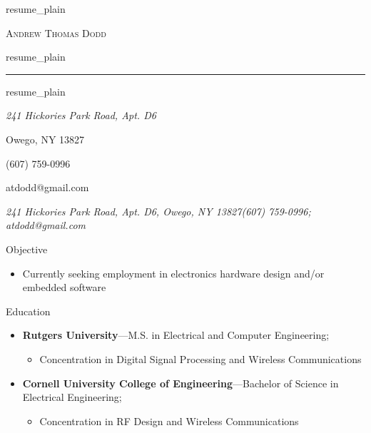 \documentclass[10pt,oneside]{article}
\makeatletter
\newcommand{\name}{Andrew Thomas Dodd}
\newcommand{\addra}{241 Hickories Park Road, Apt. D6}
\newcommand{\addrb}{Owego, NY 13827}
\newcommand{\addr}{\addra, \addrb}
\newcommand{\phone}{(607) 759-0996}
\newcommand{\email}{atdodd@gmail.com}
\def\txtname{resume_plain}\edef\txtname{\expandafter\strip@prefix\meaning\txtname}
\edef\fname{\jobname}
\newcommand{\bigname}[1]{
	\begin{center}\Huge\scshape#1\end{center}
}
\newenvironment{ressection}[1]{
	\vspace{4pt}
	{\Large#1}
	\begin{itemize}
	\vspace{3pt}
}{
	\end{itemize}
}
\newcommand{\resitem}[1]{
	\vspace{-4pt}
	\item \begin{flushleft} #1 \end{flushleft}
}
\newcommand{\ressubitem}[1]{
	\vspace{-1pt}
	\item \begin{flushleft} #1 \end{flushleft}
}
\newcommand{\resbigitem}[3]{
	\vspace{-5pt}
	\item
	\textbf{#1}---#2; \quad \textit{#3}
}
\newenvironment{ressubsec}[3]{
	\resbigitem{#1}{#2}{#3}
	\vspace{-2pt}
	\begin{itemize}
}{
	\end{itemize}
}
\newcommand{\bigname}[1]{
	\begin{center}\fontfamily{phv}\selectfont\Huge\scshape#1\end{center}
}
\newenvironment{ressection}[1]{
	\vspace{4pt}
	{\fontfamily{phv}\selectfont\Large#1}
	\begin{itemize}
	\vspace{3pt}
}{
	\end{itemize}
}
\newcommand{\resitem}[1]{
	\vspace{-4pt}
	\item \begin{flushleft} #1 \end{flushleft}
}
\newcommand{\ressubitem}[1]{
	\vspace{-1pt}
	\item \begin{flushleft} #1 \end{flushleft}
}
\newcommand{\resbigitem}[2]{
	\vspace{-5pt}
	\item
	\textbf{#1}---\textit{#2}
}
\newenvironment{ressubsec}[2]{
	\resbigitem{#1}{#2}
	\vspace{-2pt}
	\begin{itemize}
}{
	\end{itemize}
}
\makeatother
\begin{document}
\ifx\fname\txtname
\else
{} \selectfont
\fi

\bigname{\name}

\ifx\fname\txtname
\else
\vspace{-8pt} \rule{\textwidth}{1pt}
\fi

\ifx\fname\txtname
\vspace{-1pt} {\small\itshape \addra

\addrb

\phone

\email}

\else
\vspace{-1pt} {\small\itshape \addr \hfill \phone; \email}
\fi

\vspace{8 pt}


\begin{ressection}{Objective}
	\resitem{Currently seeking employment in electronics hardware design and/or embedded software}
\end{ressection}

\begin{ressection}{Education}

	\begin{ressubsec}{Rutgers University}{M.S. in Electrical and Computer Engineering}
		\ressubitem{Graduated in December 2005}
		\ressubitem{Concentration in Digital Signal Processing and Wireless Communications}
	\end{ressubsec}

	\begin{ressubsec}{Cornell University College of Engineering}{Bachelor of Science in Electrical Engineering}
		\ressubitem{Graduated in May 2002: John McMullen Dean's Scholar}
		\ressubitem{Concentration in RF Design and Wireless Communications}
	\end{ressubsec}

\end{ressection}
\end{document}
